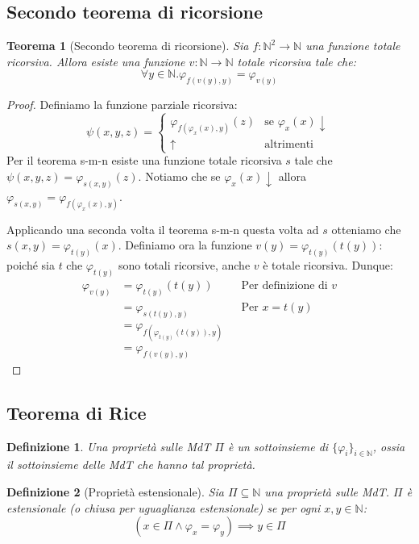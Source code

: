\documentclass[a4paper,titlepage]{article}
\newtheorem{theorem}{Teorema}[section]
\newtheorem{definition}{Definizione}[section]
\theoremstyle{definition}
\newcommand{\N}{\mathbb{N}}
\begin{document}
\subsection{Secondo teorema di ricorsione}
\begin{theorem}[Secondo teorema di ricorsione]
	Sia $f:\N^2\longrightarrow\N$ una funzione totale ricorsiva. Allora esiste una funzione $v:\N\longrightarrow\N$ totale ricorsiva tale che:
	\[
		\forall y\in\N.\varphi_{f(v(y),y)} = \varphi_{v(y)}
	\]
\end{theorem}
\begin{proof}
	Definiamo la funzione parziale ricorsiva:
	\[		
		\psi(x,y,z) =
		\begin{cases}
			\varphi_{f(\varphi_x(x),y)}(z)	 & \text{se } \varphi_x(x)\downarrow\\
			\uparrow 								& \text{altrimenti}
		\end{cases}
	\]
	Per il teorema s-m-n esiste una funzione totale ricorsiva $s$ tale che $\psi(x,y,z)=\varphi_{s(x,y)}(z)$. Notiamo che se $\varphi_x(x)\downarrow$ allora $\varphi_{s(x,y)}=\varphi_{f(\varphi_x(x), y)}$.
	
	Applicando una seconda volta il teorema s-m-n questa volta ad $s$ otteniamo che $s(x,y)=\varphi_{t(y)}(x)$. Definiamo ora la funzione $v(y)=\varphi_{t(y)}(t(y))$: poiché sia $t$ che $\varphi_{t(y)}$ sono totali ricorsive, anche $v$ è totale ricorsiva. 
	Dunque:
	\[
		\begin{aligned}
		\varphi_{v(y)} &= \varphi_{t(y)}(t(y)) &&\text{Per definizione di }v \\
							  &= \varphi_{s(t(y),y)}  &&\text{Per }x=t(y)\\
							  &= \varphi_{f(\varphi_{t(y)}(t(y)),y)}\\
							  &= \varphi_{f(v(y),y)} 
		\end{aligned}
	\]
\end{proof}

\subsection{Teorema di Rice}
\begin{definition}
	Una proprietà sulle MdT $\Pi$ è un sottoinsieme di $\{\varphi_i\}_{i\in\N}$, ossia il sottoinsieme delle MdT che hanno tal proprietà. 
\end{definition}

\begin{definition}[Proprietà estensionale]
	Sia $\Pi\subseteq\N$ una proprietà sulle MdT. $\Pi$ è estensionale (o chiusa per uguaglianza estensionale) se per ogni $x,y\in\N$:
	\[
		(x\in\Pi\land\varphi_x=\varphi_y)\implies y\in\Pi
	\]
\end{definition}
\end{document}
